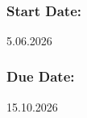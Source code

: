 \documentclass[a4paper,11pt]{article}
\begin{document}

\hspace{1cm}\
\subsubsection*{Start Date:}  5.06.2026
\subsubsection*{Due Date:} \hspace{0.07cm}  15.10.2026
\end{document}
